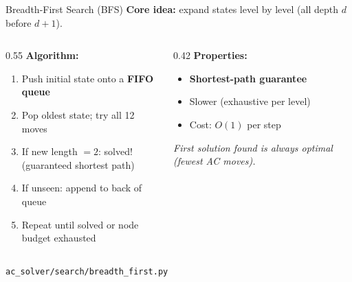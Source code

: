 \documentclass[aspectratio=169,11pt]{beamer}
\begin{document}
\begin{frame}{Breadth-First Search (BFS)}
  \textbf{Core idea:} expand states \alert{level by level} (all depth $d$ before $d{+}1$).

  \begin{columns}[T]
    \begin{column}{0.55\textwidth}
      \textbf{Algorithm:}
      \begin{enumerate}
        \item Push initial state onto a \textbf{FIFO queue}
        \item Pop oldest state; try all 12 moves
        \item If new length $= 2$: \textcolor{good}{solved!}\\
              (guaranteed shortest path)
        \item If unseen: append to back of queue
        \item Repeat until solved or node budget exhausted
      \end{enumerate}
    \end{column}
    \begin{column}{0.42\textwidth}
      \textbf{Properties:}
      \begin{itemize}
        \item[\textcolor{good}{\checkmark}] \textbf{Shortest-path guarantee}
        \item[\textcolor{bad}{$\times$}] Slower (exhaustive per level)
        \item Cost: $O(1)$ per step
      \end{itemize}

      \bigskip
      \textit{First solution found is always optimal (fewest AC moves).}
    \end{column}
  \end{columns}

  \bigskip
  \footnotesize\texttt{ac\_solver/search/breadth\_first.py}
\end{frame}
\end{document}
